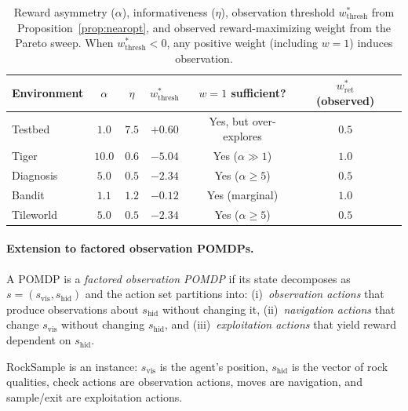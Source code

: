 \documentclass[runningheads]{llncs}
\begin{document}
\begin{table}[ht]
\centering
\caption{Reward asymmetry ($\alpha$), informativeness ($\eta$), observation threshold $w^*_{\text{thresh}}$ from Proposition~\ref{prop:nearopt}, and observed reward-maximizing weight from the Pareto sweep. When $w^*_{\text{thresh}} < 0$, any positive weight (including $w{=}1$) induces observation.}
\label{tab:alpha_eta}
\begin{small}
\begin{tabular}{lcccccc}
\toprule
Environment & $\alpha$ & $\eta$ & $w^*_{\text{thresh}}$ & $w{=}1$ sufficient? & $w^*_{\text{ret}}$ (observed) \\
\midrule
Testbed & $1.0$ & $7.5$ & $+0.60$ & Yes, but over-explores & $0.5$ \\
Tiger & $10.0$ & $0.6$ & $-5.04$ & Yes ($\alpha \gg 1$) & $1.0$ \\
Diagnosis & $5.0$ & $0.5$ & $-2.34$ & Yes ($\alpha \geq 5$) & $0.5$ \\
Bandit & $1.1$ & $1.2$ & $-0.12$ & Yes (marginal) & $1.0$ \\
Tileworld & $5.0$ & $0.5$ & $-2.34$ & Yes ($\alpha \geq 5$) & $0.5$ \\
\bottomrule
\end{tabular}
\end{small}
\end{table}

\paragraph{Extension to factored observation POMDPs.}
\label{par:frontier}

\begin{definition}
\label{def:factored}
A POMDP is a \emph{factored observation POMDP} if its state decomposes as $s = (s_{\mathrm{vis}}, s_{\mathrm{hid}})$ and the action set partitions into: (i)~\emph{observation actions} that produce observations about $s_{\mathrm{hid}}$ without changing it, (ii)~\emph{navigation actions} that change $s_{\mathrm{vis}}$ without changing $s_{\mathrm{hid}}$, and (iii)~\emph{exploitation actions} that yield reward dependent on $s_{\mathrm{hid}}$.
\end{definition}

RockSample \citep{smith2004} is an instance: $s_{\mathrm{vis}}$ is the agent's position, $s_{\mathrm{hid}}$ is the vector of rock qualities, check actions are observation actions, moves are navigation, and sample/exit are exploitation actions.
\end{document}
